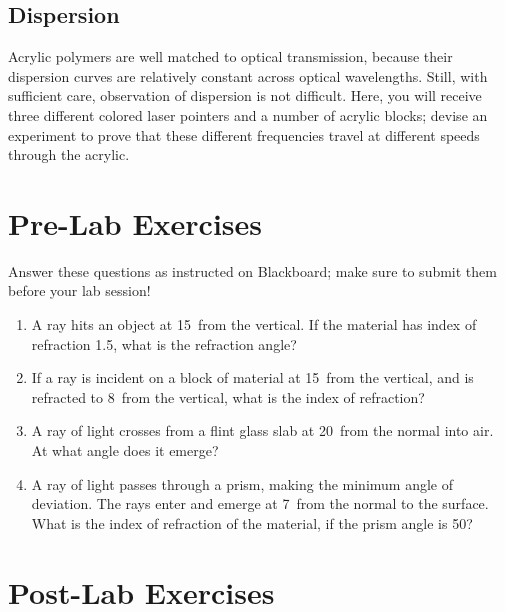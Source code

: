 \documentclass[12pt]{article}
\begin{document}

\subsection{Dispersion}
\label{sec:dispersion}

Acrylic polymers are well matched to optical transmission, because
their dispersion curves are relatively constant across optical
wavelengths.  Still, with sufficient care, observation of dispersion
is not difficult.  Here, you will receive three different colored
laser pointers and a number of acrylic blocks; devise an experiment to
prove that these different frequencies travel at different speeds
through the acrylic.

\newpage
 
\section*{Pre-Lab Exercises}

Answer these questions as instructed on Blackboard; make sure to
submit them before your lab session!

\begin{enumerate}
\item A ray hits an object at 15\textdegree\  from the vertical.  If the
  material has index of refraction 1.5, what is the refraction angle?
\item If a ray is incident on a block of material at 15\textdegree\ 
  from the vertical, and is refracted to 8\textdegree\  from the
  vertical, what is the index of refraction?
\item  A ray of light crosses from a flint glass slab at
  20\textdegree\  from the normal into air.  At what angle does it
  emerge? 
\item A ray of light passes through a prism, making the minimum angle
  of deviation.  The rays enter and emerge at 7\textdegree\ from the
  normal to the surface.  What is the index of refraction of the
  material, if the prism angle is 50\textdegree?
\end{enumerate}

\newpage

\section*{Post-Lab Exercises}
\end{document}
